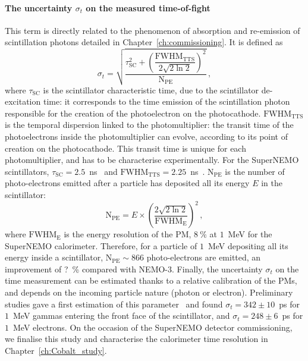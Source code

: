 \paragraph{The uncertainty $\sigma_{t}$ on the measured time-of-fight}
This term is directly related to the phenomenon of absorption and re-emission of scintillation photons detailed in Chapter~\ref{ch:commissioning}.
It is defined as
\begin{equation}
  \sigma_{t}=\sqrt{\dfrac{\tau_{\text{SC}}^{2}+\left(\dfrac{\text{FWHM}_{\text{TTS}}}{2\sqrt{2\ln{2}}}\right)^{2}}{\text{N}_\text{PE}}}\,,
  \label{eq:sigma_t}
\end{equation}
where $\tau_{\text{SC}}$ is the scintillator characteristic time, due to the scintillator de-excitation time: it corresponds to the time emission of the scintillation photon responsible for the creation of the photoelectron on the photocathode.
$\text{FWHM}_{\text{TTS}}$ is the temporal dispersion linked to the photomultiplier: the transit time of the photoelectrons inside the photomultiplier can evolve, according to its point of creation on the photocathode.
This transit time is unique for each photomultiplier, and has to be characterise experimentally.
For the SuperNEMO scintillators, $\tau_{\text{SC}}=2.5$~ns~\cite{ref} and $\text{FWHM}_{\text{TTS}}=2.25$~ns~\cite{ref}.
$\text{N}_\text{PE}$ is the number of photo-electrons emitted after a particle has deposited all its energy $E$ in the scintillator:
\begin{equation}
  \text{N}_\text{PE} = E\times \left(\frac{2\sqrt{2\ln 2}}{\text{FWHM}_{\text{E}}}\right)^{2}\,,
\end{equation}
where $\text{FWHM}_{\text{E}}$ is the energy resolution of the PM, $8~\%$ at $1$~MeV for the SuperNEMO calorimeter.
Therefore, for a particle of $1$~MeV depositing all its energy inside a scintillator, $\text{N}_\text{PE}\sim 866$ photo-electrons are emitted, an improvement of ?~\% compared with NEMO-$3$.
Finally, the uncertainty $\sigma_{t}$ on the time measurement can be estimated thanks to a relative calibration of the PMs, and depends on the incoming particle nature (photon or electron).
Preliminary studies gave a first estimation of this parameter~\cite{HuberThesis} and found $\sigma_{t}=342\pm 10$~ps for $1$~MeV gammas entering the front face of the scintillator, and $\sigma_{t}=248\pm 6$~ps for $1$~MeV electrons.
On the occasion of the SuperNEMO detector commissioning, we finalise this study and characterise the calorimeter time resolution in Chapter~\ref{ch:Cobalt_study}.

